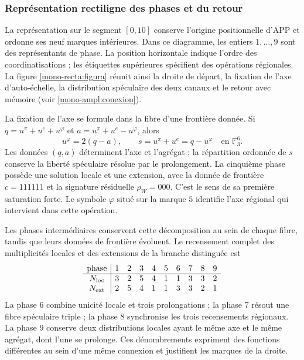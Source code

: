 
\subsubsection{Représentation rectiligne des phases et du retour}
\label{mono-recta:desarrollo}

La représentation sur le segment \([0,10]\) conserve l’origine
positionnelle d’APP et ordonne ses neuf marques intérieures. Dans ce diagramme,
les entiers \(1,\ldots,9\) sont des représentants de phase. La position
horizontale indique l’ordre des coordinatisations ; les étiquettes supérieures
spécifient des opérations régionales. La figure
\ref{mono-recta:figura} réunit ainsi la droite de départ, la fixation de
l’axe d’auto-échelle, la distribution spéculaire des deux canaux et le
retour avec mémoire (voir \ref{mono-ampl:conexion}).



La fixation de l'axe se formule dans la fibre d'une frontière donnée. Si
\(q=u^\pi+u^e+u^\varphi\) et
\(a=u^\pi+u^e-u^\varphi\), alors
\[
 u^\varphi=2(q-a),\qquad s=u^\pi+u^e=q-u^\varphi
 \quad\text{en }\mathbb F_3^6.
\]
Les données \((q,a)\) déterminent l'axe et l'agrégat ; la répartition ordonnée de \(s\) conserve la liberté spéculaire résolue par le prolongement. La cinquième phase possède une solution locale et une extension, avec la donnée de frontière \(c=111111\) et la signature résiduelle \(\rho_W=000\). C'est le sens de sa première saturation forte. Le symbole \(\varphi\) situé sur la marque \(5\) identifie l'axe régional qui intervient dans cette opération.

Les phases intermédiaires conservent cette décomposition au sein de chaque fibre,
tandis que leurs données de frontière évoluent. Le recensement complet des
multiplicités locales et des extensions de la branche distinguée est
\[
\begin{array}{c|rrrrrrrrr}
\text{phase}&1&2&3&4&5&6&7&8&9\\\hline
N_{\rm loc}&3&2&5&4&1&1&3&3&2\\
N_{\rm ext}&2&5&4&1&1&3&3&2&1
\end{array}
\]
La phase \(6\) combine unicité locale et trois prolongations ; la phase
\(7\) résout une fibre spéculaire triple ; la phase \(8\) synchronise
les trois recensements régionaux. La phase \(9\) conserve deux distributions
locales ayant le même axe et le même agrégat, dont l'une se
prolonge. Ces dénombrements expriment des fonctions différentes au sein d'une
même connexion et justifient les marques de la droite.

